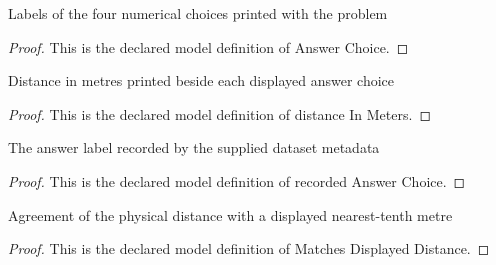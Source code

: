 \begin{definition}
  \label{def:physics:phyx-mini-0255:phyxminiproblems-problemphyxmini0255-answerchoice}
  Labels of the four numerical choices printed with the problem
\end{definition}
\begin{proof}
  This is the declared model definition of Answer Choice.
\end{proof}
\begin{definition}
  \label{def:physics:phyx-mini-0255:phyxminiproblems-problemphyxmini0255-answerchoice-distanceinmeters}
  Distance in metres printed beside each displayed answer choice
\end{definition}
\begin{proof}
  This is the declared model definition of distance In Meters.
\end{proof}
\begin{definition}
  \label{def:physics:phyx-mini-0255:phyxminiproblems-problemphyxmini0255-recordedanswerchoice}
  The answer label recorded by the supplied dataset metadata
\end{definition}
\begin{proof}
  This is the declared model definition of recorded Answer Choice.
\end{proof}
\begin{definition}
  \label{def:physics:phyx-mini-0255:phyxminiproblems-problemphyxmini0255-matchesdisplayeddistance}
  Agreement of the physical distance with a displayed nearest-tenth metre
\end{definition}
\begin{proof}
  This is the declared model definition of Matches Displayed Distance.
\end{proof}
